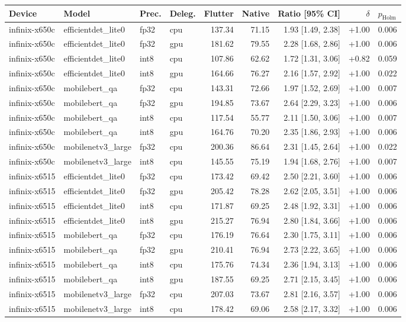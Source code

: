 \begin{tabular}{llllrrrrl}
\toprule
Device & Model & Prec. & Deleg. & Flutter & Native & Ratio [95\% CI] & $\delta$ & $p_{\mathrm{Holm}}$ \\
\midrule
infinix-x650c & efficientdet\_lite0 & fp32 & cpu & 137.34 & 71.15 & 1.93 [1.49, 2.38] & +1.00 & 0.006 \\
infinix-x650c & efficientdet\_lite0 & fp32 & gpu & 181.62 & 79.55 & 2.28 [1.68, 2.86] & +1.00 & 0.006 \\
infinix-x650c & efficientdet\_lite0 & int8 & cpu & 107.86 & 62.62 & 1.72 [1.31, 3.06] & +0.82 & 0.059 \\
infinix-x650c & efficientdet\_lite0 & int8 & gpu & 164.66 & 76.27 & 2.16 [1.57, 2.92] & +1.00 & 0.022 \\
infinix-x650c & mobilebert\_qa & fp32 & cpu & 143.31 & 72.66 & 1.97 [1.52, 2.69] & +1.00 & 0.007 \\
infinix-x650c & mobilebert\_qa & fp32 & gpu & 194.85 & 73.67 & 2.64 [2.29, 3.23] & +1.00 & 0.006 \\
infinix-x650c & mobilebert\_qa & int8 & cpu & 117.54 & 55.77 & 2.11 [1.50, 3.06] & +1.00 & 0.007 \\
infinix-x650c & mobilebert\_qa & int8 & gpu & 164.76 & 70.20 & 2.35 [1.86, 2.93] & +1.00 & 0.006 \\
infinix-x650c & mobilenetv3\_large & fp32 & cpu & 200.36 & 86.64 & 2.31 [1.45, 2.64] & +1.00 & 0.022 \\
infinix-x650c & mobilenetv3\_large & int8 & cpu & 145.55 & 75.19 & 1.94 [1.68, 2.76] & +1.00 & 0.007 \\
infinix-x6515 & efficientdet\_lite0 & fp32 & cpu & 173.42 & 69.42 & 2.50 [2.21, 3.60] & +1.00 & 0.006 \\
infinix-x6515 & efficientdet\_lite0 & fp32 & gpu & 205.42 & 78.28 & 2.62 [2.05, 3.51] & +1.00 & 0.006 \\
infinix-x6515 & efficientdet\_lite0 & int8 & cpu & 171.87 & 69.25 & 2.48 [1.92, 3.31] & +1.00 & 0.006 \\
infinix-x6515 & efficientdet\_lite0 & int8 & gpu & 215.27 & 76.94 & 2.80 [1.84, 3.66] & +1.00 & 0.006 \\
infinix-x6515 & mobilebert\_qa & fp32 & cpu & 176.19 & 76.64 & 2.30 [1.75, 3.11] & +1.00 & 0.006 \\
infinix-x6515 & mobilebert\_qa & fp32 & gpu & 210.41 & 76.94 & 2.73 [2.22, 3.65] & +1.00 & 0.006 \\
infinix-x6515 & mobilebert\_qa & int8 & cpu & 175.76 & 74.34 & 2.36 [1.94, 3.13] & +1.00 & 0.006 \\
infinix-x6515 & mobilebert\_qa & int8 & gpu & 187.55 & 69.25 & 2.71 [2.15, 3.45] & +1.00 & 0.006 \\
infinix-x6515 & mobilenetv3\_large & fp32 & cpu & 207.03 & 73.67 & 2.81 [2.16, 3.57] & +1.00 & 0.006 \\
infinix-x6515 & mobilenetv3\_large & int8 & cpu & 178.42 & 69.06 & 2.58 [2.17, 3.32] & +1.00 & 0.006 \\
\bottomrule
\end{tabular}
